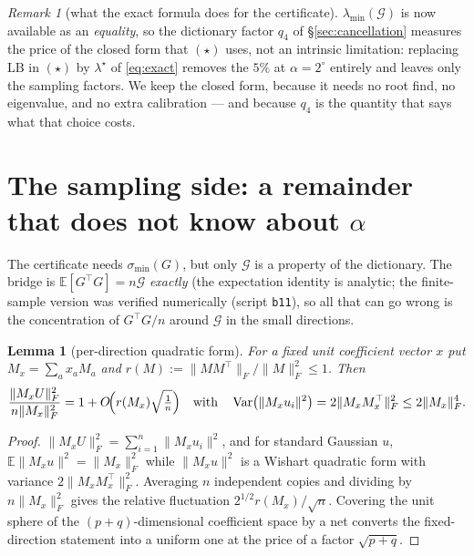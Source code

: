 \documentclass[11pt]{article}
\newtheorem{lemma}[theorem]{Lemma}
\theoremstyle{remark}
\newtheorem{remark}{Remark}[section]
\newcommand{\Gr}{\mathcal{G}}
\newcommand{\minr}[1]{\sigma_{\min}(#1)}
\begin{document}
\begin{remark}[what the exact formula does for the certificate]
\label{rem:exactcost}
$\lambda_{\min}(\Gr)$ is now available as an \emph{equality}, so the dictionary factor $q_4$ of
\S\ref{sec:cancellation} measures the price of the closed form that $(\star)$ uses, not an
intrinsic limitation: replacing $\mathrm{LB}$ in $(\star)$ by $\lambda^{\star}$ of
\eqref{eq:exact} removes the $5\%$ at $\alpha=2^\circ$ entirely and leaves only the sampling
factors. We keep the closed form, because it needs no root find, no eigenvalue, and no extra
calibration --- and because $q_4$ is the quantity that says what that choice costs.
\end{remark}

\section{The sampling side: a remainder that does not know about $\alpha$}
\label{sec:sampling}

The certificate needs $\minr G$, but only $\Gr$ is a property of the dictionary. The
bridge is
$\mathbb{E}[G^{\top}G]=n\Gr$ \emph{exactly} (the expectation identity is analytic; the
finite-sample version was verified numerically (script \texttt{b11}),
so all that can go wrong is the concentration of
$G^{\top}G/n$ around $\Gr$ in the small directions.

\begin{lemma}[per-direction quadratic form]\label{lem:quad}
For a fixed unit coefficient vector $x$ put $M_x=\sum_a x_aM_a$ and
$r(M):=\|MM^{\top}\|_F/\|M\|_F^2\le1$. Then
\begin{equation}\label{eq:quad}
  \frac{\|M_xU\|_F^2}{n\|M_x\|_F^2}=1+O\!\Bigl(r(M_x)\sqrt{\tfrac1n}\Bigr)
  \quad\text{with}\quad
  \operatorname{Var}\bigl(\|M_xu_i\|^2\bigr)=2\|M_xM_x^{\top}\|_F^2\le2\|M_x\|_F^4 .
\end{equation}
\end{lemma}

\begin{proof}
$\|M_xU\|_F^2=\sum_{i=1}^{n}\|M_xu_i\|^2$, and for standard Gaussian $u$,
$\mathbb{E}\|M_xu\|^2=\|M_x\|_F^2$ while $\|M_xu\|^2$ is a Wishart quadratic form with
variance $2\|M_xM_x^{\top}\|_F^2$. Averaging $n$ independent copies and dividing by
$n\|M_x\|_F^2$ gives the relative fluctuation
$2^{1/2}r(M_x)/\sqrt n$. Covering the unit sphere of the $(p+q)$-dimensional
coefficient space by a net converts the fixed-direction statement into a uniform one at
the price of a factor $\sqrt{p+q}$.
\end{proof}
\end{document}
